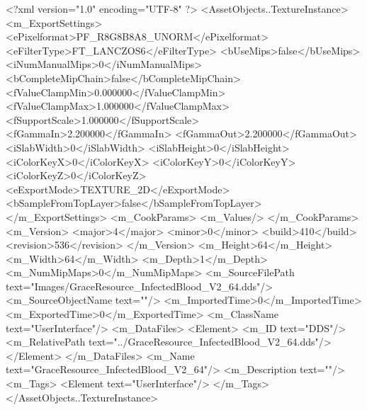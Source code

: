 <?xml version="1.0" encoding="UTF-8" ?>
<AssetObjects..TextureInstance>
	<m_ExportSettings>
		<ePixelformat>PF_R8G8B8A8_UNORM</ePixelformat>
		<eFilterType>FT_LANCZOS6</eFilterType>
		<bUseMips>false</bUseMips>
		<iNumManualMips>0</iNumManualMips>
		<bCompleteMipChain>false</bCompleteMipChain>
		<fValueClampMin>0.000000</fValueClampMin>
		<fValueClampMax>1.000000</fValueClampMax>
		<fSupportScale>1.000000</fSupportScale>
		<fGammaIn>2.200000</fGammaIn>
		<fGammaOut>2.200000</fGammaOut>
		<iSlabWidth>0</iSlabWidth>
		<iSlabHeight>0</iSlabHeight>
		<iColorKeyX>0</iColorKeyX>
		<iColorKeyY>0</iColorKeyY>
		<iColorKeyZ>0</iColorKeyZ>
		<eExportMode>TEXTURE_2D</eExportMode>
		<bSampleFromTopLayer>false</bSampleFromTopLayer>
	</m_ExportSettings>
	<m_CookParams>
		<m_Values/>
	</m_CookParams>
	<m_Version>
		<major>4</major>
		<minor>0</minor>
		<build>410</build>
		<revision>536</revision>
	</m_Version>
	<m_Height>64</m_Height>
	<m_Width>64</m_Width>
	<m_Depth>1</m_Depth>
	<m_NumMipMaps>0</m_NumMipMaps>
	<m_SourceFilePath text="Images/GraceResource_InfectedBlood_V2_64.dds"/>
	<m_SourceObjectName text=""/>
	<m_ImportedTime>0</m_ImportedTime>
	<m_ExportedTime>0</m_ExportedTime>
	<m_ClassName text="UserInterface"/>
	<m_DataFiles>
		<Element>
			<m_ID text="DDS"/>
			<m_RelativePath text="../GraceResource_InfectedBlood_V2_64.dds"/>
		</Element>
	</m_DataFiles>
	<m_Name text="GraceResource_InfectedBlood_V2_64"/>
	<m_Description text=""/>
	<m_Tags>
		<Element text="UserInterface"/>
	</m_Tags>
</AssetObjects..TextureInstance>
